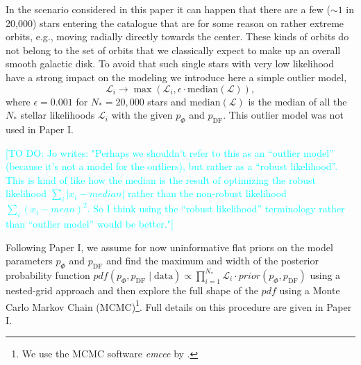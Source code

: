 \documentclass[iop,revtex4,numberedappendix,appendixfloats]{emulateapj}
\newcommand{\pdf}{\ensuremath{pdf}}
\newcommand{\Jo}[1]{\textcolor{Cyan}{#1}}
\begin{document}
In the scenario considered in this paper it can happen that there are a few ($\sim 1$ in 20,000) stars entering the catalogue that are for some reason  on rather extreme orbits, e.g., moving radially directly towards the center. These kinds of orbits do not belong to the set of orbits that we classically expect to make up an overall smooth galactic disk. To avoid that such single stars with very low likelihood have a strong impact on the modeling we introduce here a simple outlier model,
\begin{equation}
\mathscr{L}_i \longrightarrow \max \left( \mathscr{L}_i, \epsilon \cdot \text{median}(\mathscr{L})\right),
\end{equation}
where $\epsilon = 0.001$ for $N_*=20,000$ stars and $\text{median}(\mathscr{L})$ is the median of all the $N_*$ stellar likelihoods $\mathscr{L}_i$ with the given $p_\Phi$ and $p_\text{DF}$. This outlier model was not used in Paper I.

\Jo{[TO DO: Jo writes: "Perhaps we shouldn’t refer to this as an “outlier model” (because it’s not a model for the outliers), but rather as a “robust likelihood”. This is kind of like how the median is the result of optimizing the robust likelihood $\sum_i |x_i-median|$ rather than the non-robust likelihood $\sum_i (x_i-mean)^2$. So I think using the “robust likelihood” terminology rather than “outlier model” would be better."]}

Following Paper I, we assume for now uninformative flat priors on the model parameters $p_\Phi$ and $p_\text{DF}$ and find the maximum and width of the posterior probability function $pdf(p_\Phi,p_\text{DF} \mid \text{data}) \propto \prod_{i=1}^{N_*} \mathscr{L}_i \cdot prior(p_\Phi,p_\text{DF})$ using a nested-grid approach and then explore the full shape of the $\pdf$ using a Monte Carlo Markov Chain (MCMC)\footnote{We use the MCMC software \emph{emcee} by \citet{2013PASP..125..306F}.}. Full details on this procedure are given in Paper I.
\end{document}
